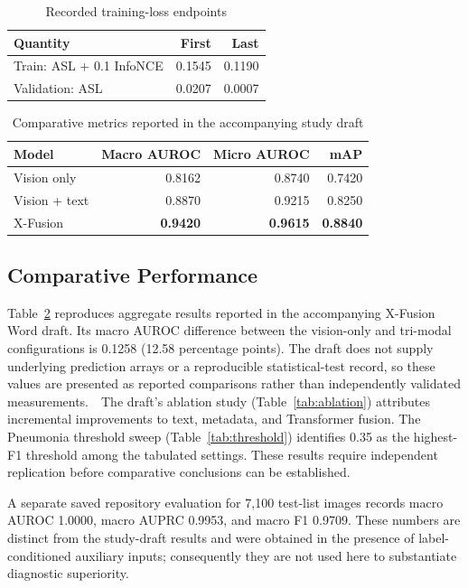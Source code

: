 \documentclass[conference,letterpaper]{IEEEtran}
\begin{document}
\begin{table}[t]
\caption{Recorded training-loss endpoints}\label{tab:losses}
\centering\footnotesize
\begin{tabular}{lrr}\toprule
Quantity & First & Last\\\midrule
Train: ASL + 0.1 InfoNCE & 0.1545 & 0.1190\\
Validation: ASL & 0.0207 & 0.0007\\\bottomrule
\end{tabular}
\end{table}

\begin{table}[t]
\caption{Comparative metrics reported in the accompanying study draft}\label{tab:overall}
\centering\footnotesize
\begin{tabular}{lrrr}\toprule
Model & Macro AUROC & Micro AUROC & mAP\\\midrule
Vision only & 0.8162 & 0.8740 & 0.7420\\
Vision + text & 0.8870 & 0.9215 & 0.8250\\
X-Fusion & \textbf{0.9420} & \textbf{0.9615} & \textbf{0.8840}\\\bottomrule
\end{tabular}
\end{table}

\subsection{Comparative Performance}
Table~\ref{tab:overall} reproduces aggregate results reported in the accompanying X-Fusion Word draft. Its macro AUROC difference between the vision-only and tri-modal configurations is 0.1258 (12.58 percentage points). The draft does not supply underlying prediction arrays or a reproducible statistical-test record, so these values are presented as reported comparisons rather than independently validated measurements.\ \ The draft's ablation study (Table~\ref{tab:ablation}) attributes incremental improvements to text, metadata, and Transformer fusion. The Pneumonia threshold sweep (Table~\ref{tab:threshold}) identifies 0.35 as the highest-F1 threshold among the tabulated settings. These results require independent replication before comparative conclusions can be established.

A separate saved repository evaluation for 7,100 test-list images records macro AUROC 1.0000, macro AUPRC 0.9953, and macro F1 0.9709. These numbers are distinct from the study-draft results and were obtained in the presence of label-conditioned auxiliary inputs; consequently they are not used here to substantiate diagnostic superiority.
\end{document}
